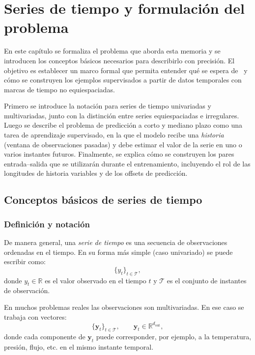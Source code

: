 \chapter{Series de tiempo y formulación del problema}
\label{cap:series-tiempo}

En este capítulo se formaliza el problema que aborda esta memoria y se introducen los conceptos básicos necesarios para describirlo con precisión. El objetivo es establecer un marco formal que permita entender qué se espera de \CTTransformer\ y cómo se construyen los ejemplos supervisados a partir de datos temporales con marcas de tiempo no equiespaciadas.

\hfill

Primero se introduce la notación para series de tiempo univariadas y multivariadas, junto con la distinción entre series equiespaciadas e irregulares. Luego se describe el problema de predicción a corto y mediano plazo como una tarea de aprendizaje supervisado, en la que el modelo recibe una \emph{historia} (ventana de observaciones pasadas) y debe estimar el valor de la serie en uno o varios instantes futuros. Finalmente, se explica cómo se construyen los pares entrada--salida que se utilizarán durante el entrenamiento, incluyendo el rol de las longitudes de historia variables y de los offsets de predicción.

\section{Conceptos básicos de series de tiempo}

\subsection{Definición y notación}

De manera general, una \textit{serie de tiempo} es una secuencia de observaciones ordenadas en el tiempo. En su forma más simple (caso univariado) se puede escribir como:
\begin{equation}
    \{y_t\}_{t \in \mathcal{T}},
\end{equation}
donde $y_t \in \mathbb{R}$ es el valor observado en el tiempo $t$ y $\mathcal{T}$ es el conjunto de instantes de observación.

\hfill

En muchos problemas reales las observaciones son multivariadas. En ese caso se trabaja con vectores:
\begin{equation}
    \{\mathbf{y}_t\}_{t \in \mathcal{T}}, \qquad \mathbf{y}_t \in \mathbb{R}^{d_{\text{out}}},
\end{equation}
donde cada componente de $\mathbf{y}_t$ puede corresponder, por ejemplo, a la temperatura, presión, flujo, etc. en el mismo instante temporal.

